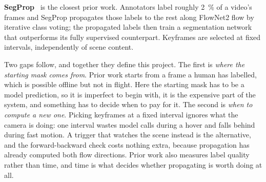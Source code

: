 \documentclass[report.tex]{subfiles}
\begin{document}
\textbf{SegProp}~\cite{segprop2020} is the closest prior work. Annotators label
roughly \SI{2}{\percent} of a video's frames and SegProp propagates those
labels to the rest along FlowNet2 flow by iterative class voting; the
propagated labels then train a segmentation network that outperforms its fully
supervised counterpart. Keyframes are selected at fixed intervals, independently
of scene content.

Two gaps follow, and together they define this project. The first is
\emph{where the starting mask comes from}. Prior work starts from a frame a
human has labelled, which is possible offline but not in flight. Here the
starting mask has to be a model prediction, so it is imperfect to begin with,
it is the expensive part of the system, and something has to decide when to
pay for it. The second is \emph{when to compute a new one}. Picking keyframes
at a fixed interval ignores what the camera is doing: one interval wastes
model calls during a hover and falls behind during fast motion. A trigger that
watches the scene instead is the alternative, and the forward-backward check
costs nothing extra, because propagation has already computed both flow
directions. Prior work also measures label quality rather than time, and time
is what decides whether propagating is worth doing at all.
\end{document}

